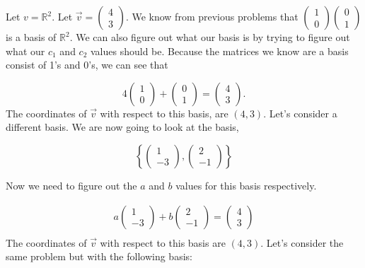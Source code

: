   \begin{problem}
    Let $v=\mathbb{R}^2$. Let $\vec{v}=\left(\begin{smallmatrix}4\\3\end{smallmatrix}\right)$. We know from previous problems that $\left(\begin{smallmatrix}1\\0\end{smallmatrix}\right)\left(\begin{smallmatrix}0\\1\end{smallmatrix}\right)$ is a basis of $\mathbb{R}^2$. We can also figure out what our basis is by trying to figure out what our $c_1$ and $c_2$ values should be. Because the matrices we know are a basis consist of 1's and 0's, we can see that 

    \begin{equation}
      4
      \begin{pmatrix}
        1\\0
      \end{pmatrix}
      +
      \begin{pmatrix}
        0\\1
      \end{pmatrix}
      =
      \begin{pmatrix}
        4\\3
      \end{pmatrix}.
    \end{equation}
    The coordinates of $\vec{v}$ with respect to this basis, are $(4,3)$. Let's consider a different basis. We are now going to look at the basis,

    \begin{equation}
      \left\{
        \begin{pmatrix}
          1\\-3
        \end{pmatrix},
        \begin{pmatrix}
          2\\-1
        \end{pmatrix}
      \right\}
    \end{equation}

    Now we need to figure out the $a$ and $b$ values for this basis respectively.

    \begin{align}
      a
      \begin{pmatrix}
        1\\-3 
      \end{pmatrix}
      + b
      \begin{pmatrix}
        2\\-1
      \end{pmatrix}
      =
      \begin{pmatrix}
        4\\3
      \end{pmatrix}
      \\
    \end{align}
    The coordinates of $\vec{v}$ with respect to this basis are $(4,3)$. Let's consider the same problem but with the following basis:


\end{problem}
